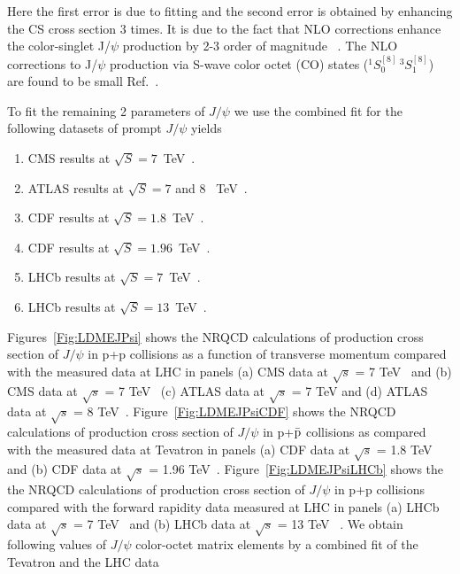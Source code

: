 \documentclass[aps,prc,preprint,superscriptaddress,showpacs,showkeys,amsmath]{revtex4-1}
\begin{document}
Here the first error is due to fitting and the second error is 
obtained by enhancing the CS cross section 3 times. 
  It is due to the fact that NLO corrections enhance the color-singlet J/$\psi$ production 
by 2-3 order of magnitude ~\cite{Gong:2008sn}.
 The NLO corrections to J/$\psi$ production via S-wave color octet (CO) states 
($^1S_{0}^{[8]}\,^3S_{1}^{[8]}$) are found to be small Ref.~\cite{Gong:2008ft}.

  To fit the remaining 2 parameters of $J/\psi$ we use the combined fit for the
following datasets of prompt $J/\psi$ yields
\begin{enumerate}
\item{CMS results at $\sqrt{S}=7$~TeV~\cite{Chatrchyan:2011kc,Khachatryan:2015rra}}.
\item{ATLAS results at $\sqrt{S}=7$ and 8 ~TeV~\cite{Aad:2015duc}}.
\item{CDF results at $\sqrt{S}=1.8$~TeV~\cite{Abe:1997jz}}.
\item{CDF results at $\sqrt{S}=1.96$~TeV~\cite{Acosta:2004yw}}.
\item{LHCb results at $\sqrt{S}=7$~TeV~\cite{Aaij:2011jh}}.
\item{LHCb results at $\sqrt{S}=13$~TeV~\cite{Aaij:2015rla}}.
\end{enumerate}

 Figures~\ref{Fig:LDMEJPsi} shows the NRQCD calculations of production cross section of 
$J/\psi$ in p+p collisions as a function of transverse momentum compared with 
the measured data at LHC in panels (a) CMS data at $\sqrt{s}$ = 7 TeV~\cite{Chatrchyan:2011kc} 
and (b) CMS data at $\sqrt{s}$ = 7 TeV~\cite{Khachatryan:2015rra} (c) ATLAS data at $\sqrt{s}$ = 7 TeV 
and (d) ATLAS data at $\sqrt{s}$ = 8 TeV~\cite{Aad:2015duc}. 
   Figure~\ref{Fig:LDMEJPsiCDF} shows  the NRQCD calculations of production cross 
section of $J/\psi$ in p+{$\bar {\rm p}$}  collisions as compared with the measured data at 
Tevatron in panels 
(a) CDF data at $\sqrt{s}$ = 1.8 TeV~\cite{Abe:1997jz} and 
(b) CDF data at $\sqrt{s}$ = 1.96 TeV~\cite{Acosta:2004yw}. 
  Figure~\ref{Fig:LDMEJPsiLHCb} shows the the NRQCD calculations of production cross 
section of $J/\psi$ in p+p collisions compared with the forward rapidity data measured at LHC in panels
(a) LHCb data at $\sqrt{s}$ = 7 TeV~\cite{Aaij:2011jh} and (b) LHCb data at $\sqrt{s}$ = 13 TeV 
~\cite{Aaij:2015rla}. 
 We obtain following values of $J/\psi$ color-octet matrix elements by a combined fit of 
the Tevatron and the LHC data
\end{document}
